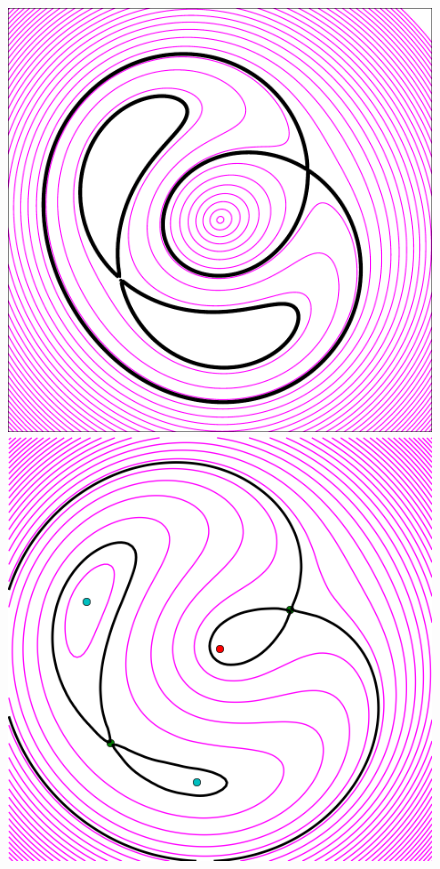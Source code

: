 \documentclass[usenatbib]{mn2e}
\newlength{\myplotswidth}
\begin{document}
\begin{figure}
  \includegraphics[width=\myplotswidth]{fig/ASW0004oux_006990_arriv}
  \includegraphics[width=\myplotswidth]{fig/006990_spaghetti} \\

\end{figure}
\end{document}
